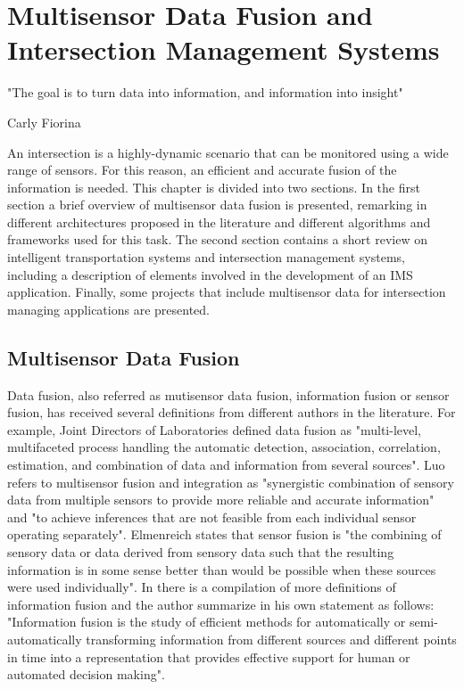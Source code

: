 %

\chapter [Multisensor Data Fusion and Intersection Management Systems]{Multisensor Data Fusion and Intersection Management Systems}

\epigraph{"The goal is to turn data into information, and information into insight"}{Carly Fiorina}

An intersection is a highly-dynamic scenario that can be monitored using a wide range of sensors. For this reason, an efficient and accurate fusion of the information is needed. This chapter is divided into two sections. In the first section a brief overview of multisensor data fusion is presented, remarking in different architectures proposed in the literature and different algorithms and frameworks used for this task. The second section contains a short review on intelligent transportation systems and intersection management systems, including a description of elements involved in the development of an IMS application. Finally, some projects that include multisensor data for intersection managing applications are presented.

\section{Multisensor Data Fusion}

Data fusion, also referred as mutisensor data fusion, information fusion or sensor fusion, has received several definitions from different authors in the literature. For example, Joint Directors of Laboratories defined data fusion as "multi-level, multifaceted process handling the automatic detection, association, correlation, estimation, and combination of data and information from several sources"\cite{White1991}. Luo refers to multisensor fusion and integration as "synergistic combination of sensory data from multiple sensors to provide more reliable and accurate information"\cite{Luo2002} and "to achieve inferences that are not feasible from each individual sensor operating separately"\cite{Luo2011}. Elmenreich states that sensor fusion is "the combining of sensory data or data derived from sensory data such that the resulting information is in some sense better than would be possible when these sources were used individually"\cite{Elmenreich2007}. In \cite{Bostrom2007} there is a compilation of more definitions of information fusion and the author summarize in his own statement as follows: "Information fusion is the study of efficient methods for automatically or semi-automatically transforming information from different sources and different points in time into a representation that provides effective support for human or automated decision making".  

